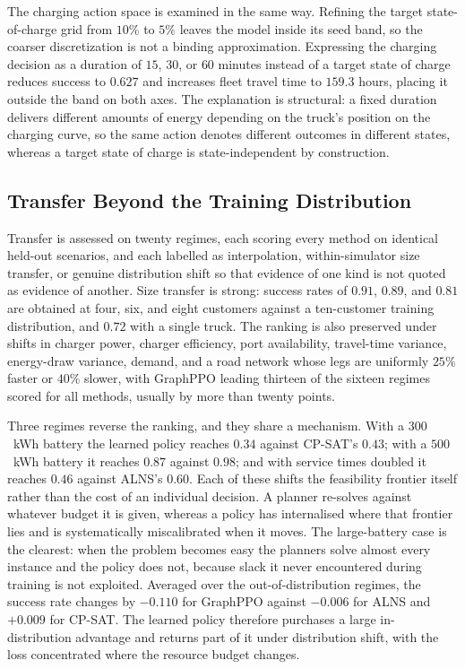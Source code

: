 \documentclass[a4paper,fleqn]{cas-sc}
\begin{document}
The charging action space is examined in the same way. Refining the target state-of-charge grid from $10\%$ to $5\%$ leaves the model inside its seed band, so the coarser discretization is not a binding approximation. Expressing the charging decision as a duration of $15$, $30$, or $60$ minutes instead of a target state of charge reduces success to $0.627$ and increases fleet travel time to $159.3$ hours, placing it outside the band on both axes. The explanation is structural: a fixed duration delivers different amounts of energy depending on the truck's position on the charging curve, so the same action denotes different outcomes in different states, whereas a target state of charge is state-independent by construction.

\subsection{Transfer Beyond the Training Distribution}\label{sec:transfer}

Transfer is assessed on twenty regimes, each scoring every method on identical held-out scenarios, and each labelled as interpolation, within-simulator size transfer, or genuine distribution shift so that evidence of one kind is not quoted as evidence of another. Size transfer is strong: success rates of $0.91$, $0.89$, and $0.81$ are obtained at four, six, and eight customers against a ten-customer training distribution, and $0.72$ with a single truck. The ranking is also preserved under shifts in charger power, charger efficiency, port availability, travel-time variance, energy-draw variance, demand, and a road network whose legs are uniformly $25\%$ faster or $40\%$ slower, with GraphPPO leading thirteen of the sixteen regimes scored for all methods, usually by more than twenty points.

Three regimes reverse the ranking, and they share a mechanism. With a $300$~kWh battery the learned policy reaches $0.34$ against CP-SAT's $0.43$; with a $500$~kWh battery it reaches $0.87$ against $0.98$; and with service times doubled it reaches $0.46$ against ALNS's $0.60$. Each of these shifts the feasibility frontier itself rather than the cost of an individual decision. A planner re-solves against whatever budget it is given, whereas a policy has internalised where that frontier lies and is systematically miscalibrated when it moves. The large-battery case is the clearest: when the problem becomes easy the planners solve almost every instance and the policy does not, because slack it never encountered during training is not exploited. Averaged over the out-of-distribution regimes, the success rate changes by $-0.110$ for GraphPPO against $-0.006$ for ALNS and $+0.009$ for CP-SAT. The learned policy therefore purchases a large in-distribution advantage and returns part of it under distribution shift, with the loss concentrated where the resource budget changes.
\end{document}
